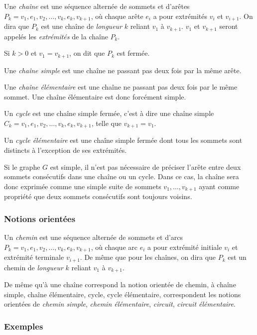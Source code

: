 \documentclass[11pt,a4paper]{report}
\begin{document}
Une {\em chaîne} est une séquence alternée de sommets et d'arêtes $P_k = v_1, e_1, v_2, \ldots, v_k, e_k, v_{k+1}$, où chaque arête $e_i$ a pour extrémités $v_i$ et $v_{i+1}$. On dira que $P_k$ est une chaîne de {\em longueur} $k$ reliant $v_1$ à $v_{k+1}$. $v_1$ et $v_{k+1}$ seront appelés les {\em extrémités} de la chaîne $P_k$.

Si $k > 0$ et $v_1 = v_{k+1}$, on dit que $P_k$ est fermée.
 
Une {\em chaîne simple} est une chaîne ne passant pas deux fois par la même arête.

Une {\em chaîne élémentaire} est une chaîne ne passant pas deux fois par le même sommet. Une chaîne élémentaire est donc forcément simple.

Un {\em cycle} est une chaîne simple fermée, c'est à dire une chaîne simple $C_k = v_1, e_1, v_2, \ldots, v_k, e_k, v_{k+1}$, telle que $v_{k+1} = v_1$.

Un {\em cycle élémentaire} est une chaîne simple fermée dont tous les sommets sont distincts à l'exception de ses extrémités.

Si le graphe $G$ est simple, il n'est pas nécessaire de préciser l'arête entre deux sommets consécutifs dans une chaîne ou un cycle. Dans ce cas, la chaîne sera donc exprimée comme une simple suite de sommets $v_1, \ldots, v_{k+1}$ ayant comme propriété que deux sommets consécutifs sont toujours voisins.

\subsubsection{Notions orientées}

Un {\em chemin} est une séquence alternée de sommets et d'arcs \\$P_k = v_1, e_1, v_2, \ldots, v_k, e_k, v_{k+1}$, où chaque arc $e_i$ a pour extrémité initiale $v_i$ et extrémité terminale $v_{i+1}$. De même que pour les chaînes, on dira que $P_k$ est un chemin de {\em longueur} $k$ reliant $v_1$ à $v_{k+1}$. 

De même qu'à une chaîne correspond la notion orientée de chemin, à chaîne simple, chaîne élémentaire, cycle, cycle élémentaire, correspondent les notions orientées de {\em chemin simple}, {\em chemin élémentaire}, {\em circuit}, {\em circuit élémentaire}.

\subsubsection{Exemples}
\end{document}

